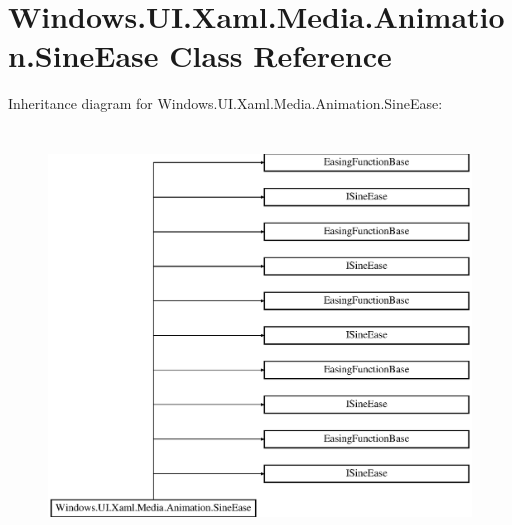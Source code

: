 \hypertarget{class_windows_1_1_u_i_1_1_xaml_1_1_media_1_1_animation_1_1_sine_ease}{}\section{Windows.\+U\+I.\+Xaml.\+Media.\+Animation.\+Sine\+Ease Class Reference}
\label{class_windows_1_1_u_i_1_1_xaml_1_1_media_1_1_animation_1_1_sine_ease}
Inheritance diagram for Windows.\+U\+I.\+Xaml.\+Media.\+Animation.\+Sine\+Ease\+:\begin{figure}[H]
\begin{center}
\leavevmode
\includegraphics[height=11.000000cm]{class_windows_1_1_u_i_1_1_xaml_1_1_media_1_1_animation_1_1_sine_ease}
\end{center}
\end{figure}

